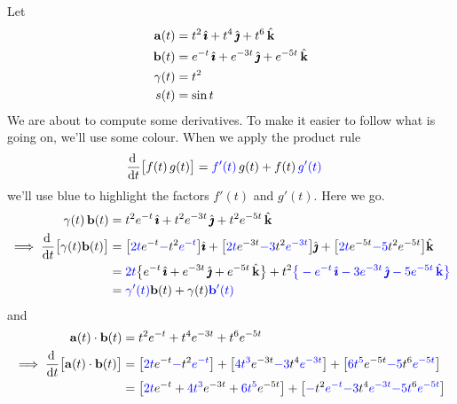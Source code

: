 \begin{eg}\label{eg:diffDot}
Let
\begin{align*}
\mathbf{a}(t)&= t^2\,\hat{\pmb{\imath}} + t^4\,\hat{\pmb{\jmath}} + t^6\,\hat{\mathbf{k}}
\\
\mathbf{b}(t)&= e^{-t}\,\hat{\pmb{\imath}} + e^{-3t}\,\hat{\pmb{\jmath}} + e^{-5t}\,\hat{\mathbf{k}}
\\
\gamma(t)&= t^2
\\
s(t)&= \sin t
\end{align*}
We are about to compute some derivatives. To make it easier to follow what is going on, we'll use some colour. When we apply the product rule
\begin{align*}
\diff{}{t}\big[f(t)\,g(t)\big]
&=\textcolor{blue}{f'(t)}\,g(t) + f(t)\,\textcolor{blue}{g'(t)}
\end{align*} 
we'll use blue to highlight the factors $f'(t)$ and $g'(t)$.
Here we go.
\begin{align*}
\ga(t)\,\vb(t) & = t^2e^{-t}\,\hi + t^2 e^{-3t}\,\hj + t^2 e^{-5t}\,\hk
\\
\implies \diff{}{t}\big[\ga(t)\vb(t)\big]
&=\big[\textcolor{blue}{2t} e^{-t}
           \textcolor{blue}{-}t^2\textcolor{blue}{e^{-t}}\big]\hi
  +\big[\textcolor{blue}{2t} e^{-3t}
           \textcolor{blue}{-3}t^2\textcolor{blue}{e^{-3t}}\big]\hj
  +\big[\textcolor{blue}{2t} e^{-5t}
          \textcolor{blue}{-5}t^2e^{-5t}\big]\hk
\\
&=\textcolor{blue}{2t}\big\{e^{-t}\,\hi + e^{-3t}\,\hj + e^{-5t}\,\hk\big\}
+ t^2
    \textcolor{blue}{\big\{-e^{-t}\,\hi -3 e^{-3t}\,\hj -5 e^{-5t}\,\hk\big\}}
\\
&=\textcolor{blue}{\ga'(t)}\vb(t)
         +\ga(t)\textcolor{blue}{\vb'(t)}
\end{align*}
and 
\begin{align*}
\va(t)\cdot\vb(t) & = t^2e^{-t} + t^4 e^{-3t} + t^6 e^{-5t}
\\
\implies \diff{}{t}\big[\va(t)\cdot\vb(t)\big]
&=\big[\textcolor{blue}{2t} e^{-t}
            \textcolor{blue}{-}t^2\textcolor{blue}{e^{-t}}\big]
  +\big[\textcolor{blue}{4t^3} e^{-3t}
            \textcolor{blue}{-3}t^4\textcolor{blue}{e^{-3t}}\big]
  +\big[\textcolor{blue}{6t^5} e^{-5t}
             \textcolor{blue}{-5}t^6\textcolor{blue}{e^{-5t}}\big]
\\
&=\big[\textcolor{blue}{2t} e^{-t}
            +\textcolor{blue}{4t^3} e^{-3t}
            +\textcolor{blue}{6t^5} e^{-5t}\big]
  +\big[\textcolor{blue}{-}t^2\textcolor{blue}{e^{-t}}
             \textcolor{blue}{-3}t^4\textcolor{blue}{e^{-3t}}
             \textcolor{blue}{-5t}^6\textcolor{blue}{e^{-5t}}\big]

\end{align*}
\end{eg}
